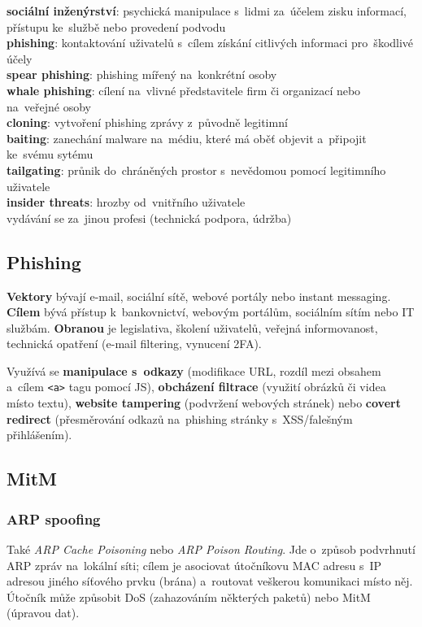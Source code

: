 \textbf{sociální inženýrství}: psychická manipulace s~lidmi za~účelem zisku informací, přístupu ke~službě nebo provedení podvodu \\
\textbf{phishing}: kontaktování uživatelů s~cílem získání citlivých informaci pro~škodlivé účely \\
\textbf{spear phishing}: phishing mířený na~konkrétní osoby \\
\textbf{whale phishing}: cílení na~vlivné představitele firm či organizací nebo na~veřejné osoby \\
\textbf{cloning}: vytvoření phishing zprávy z~původně legitimní \\
\textbf{baiting}: zanechání malware na~médiu, které má oběť objevit a~připojit ke~svému sytému \\
\textbf{tailgating}: průnik do~chráněných prostor s~nevědomou pomocí legitimního uživatele \\
\textbf{insider threats}: hrozby od~vnitřního uživatele \\
vydávání se za~jinou profesi (technická podpora, údržba)

\subsection*{Phishing}

\textbf{Vektory} bývají e-mail, sociální sítě, webové portály nebo instant messaging. \textbf{Cílem} bývá přístup k~bankovnictví, webovým portálům, sociálním sítím nebo IT službám. \textbf{Obranou} je legislativa, školení uživatelů, veřejná informovanost, technická opatření (e-mail filtering, vynucení 2FA).

Využívá se \textbf{manipulace s~odkazy} (modifikace URL, rozdíl mezi obsahem a~cílem \texttt{<a>} tagu pomocí JS), \textbf{obcházení filtrace} (využití obrázků či videa místo textu), \textbf{website tampering} (podvržení webových stránek) nebo \textbf{covert redirect} (přesměrování odkazů na~phishing stránky s~XSS/falešným přihlášením).

\subsection{MitM}

\subsubsection{ARP spoofing}

Také \emph{ARP Cache Poisoning} nebo \emph{ARP Poison Routing}. Jde o~způsob podvrhnutí ARP zpráv na~lokální síti; cílem je asociovat útočníkovu MAC adresu s~IP adresou jiného síťového prvku (brána) a~routovat veškerou komunikaci místo něj. Útočník může způsobit DoS (zahazováním některých paketů) nebo MitM (úpravou dat).

